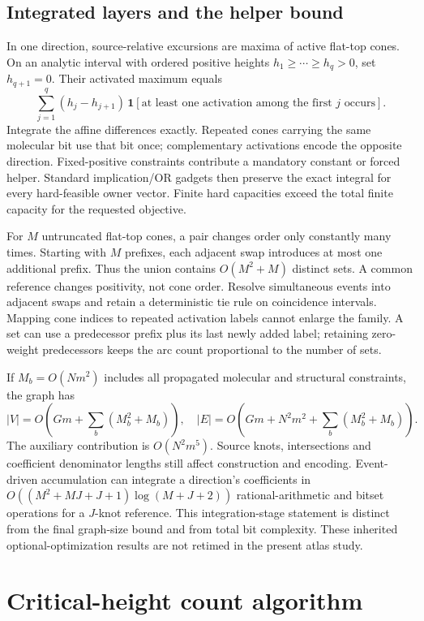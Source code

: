 \documentclass[10pt,letterpaper]{article}
\newcommand{\ind}{\mathbf 1}
\begin{document}
\subsection{Integrated layers and the helper bound}
In one direction, source-relative excursions are maxima of active flat-top cones. On an analytic interval with ordered positive heights $h_1\ge\cdots\ge h_q>0$, set $h_{q+1}=0$. Their activated maximum equals
\[
 \sum_{j=1}^{q}(h_j-h_{j+1})\,
 \ind[\text{at least one activation among the first }j\text{ occurs}].
\]
Integrate the affine differences exactly. Repeated cones carrying the same molecular bit use that bit once; complementary activations encode the opposite direction. Fixed-positive constraints contribute a mandatory constant or forced helper. Standard implication/OR gadgets then preserve the exact integral for every hard-feasible owner vector. Finite hard capacities exceed the total finite capacity for the requested objective.

For $M$ untruncated flat-top cones, a pair changes order only constantly many times. Starting with $M$ prefixes, each adjacent swap introduces at most one additional prefix. Thus the union contains $O(M^2+M)$ distinct sets. A common reference changes positivity, not cone order. Resolve simultaneous events into adjacent swaps and retain a deterministic tie rule on coincidence intervals. Mapping cone indices to repeated activation labels cannot enlarge the family. A set can use a predecessor prefix plus its last newly added label; retaining zero-weight predecessors keeps the arc count proportional to the number of sets.

If $M_b=O(Nm^2)$ includes all propagated molecular and structural constraints, the graph has
\[
 |V|=O\!\left(Gm+\sum_b(M_b^2+M_b)\right),\quad
 |E|=O\!\left(Gm+N^2m^2+\sum_b(M_b^2+M_b)\right).
\]
The auxiliary contribution is $O(N^2m^5)$. Source knots, intersections and coefficient denominator lengths still affect construction and encoding. Event-driven accumulation can integrate a direction's coefficients in $O((M^2+MJ+J+1)\log(M+J+2))$ rational-arithmetic and bitset operations for a $J$-knot reference. This integration-stage statement is distinct from the final graph-size bound and from total bit complexity. These inherited optional-optimization results are not retimed in the present atlas study.

\section{Critical-height count algorithm}
\end{document}
